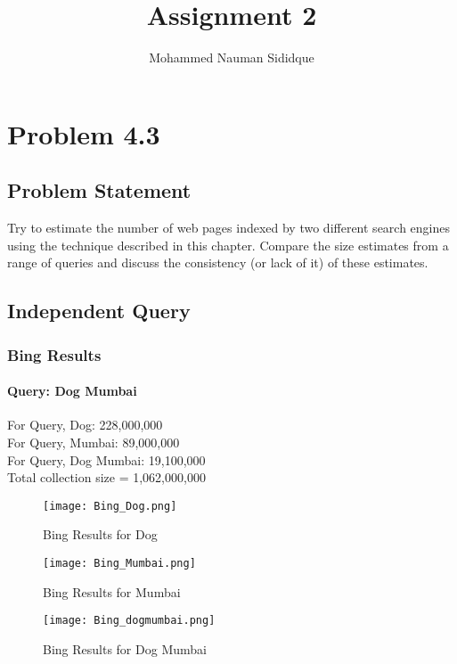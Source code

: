 \documentclass[12pt]{report}
\author{Mohammed Nauman Sididque}
\title{Assignment 2 }
\begin{document}
\maketitle
\tableofcontents

\chapter{Problem 4.3}
\section{Problem Statement}
Try to estimate the number of web pages indexed by two different search engines using the technique described in this chapter. Compare the size estimates from a range of queries and discuss the consistency (or lack of it) of these estimates. 
\section{Independent Query}
\subsection{Bing Results}
\subsubsection{Query: Dog Mumbai}
For Query, Dog: 228,000,000\\
For Query, Mumbai: 89,000,000\\
For Query, Dog Mumbai: 19,100,000\\

Total collection size = 1,062,000,000\\

\begin{figure}[ht] 
  \centering
  \texttt{[image: Bing\_Dog.png]}
  \caption{Bing Results for Dog}
  \label{fig:1}
\end{figure}

\begin{figure}[ht] 
  \centering
  \texttt{[image: Bing\_Mumbai.png]}
  \caption{Bing Results for Mumbai}
  \label{fig:2}
\end{figure}

\begin{figure}[ht] 
  \centering
  \texttt{[image: Bing\_dogmumbai.png]}
  \caption{Bing Results for Dog Mumbai}
  \label{fig:3}
\end{figure}
\end{document}
